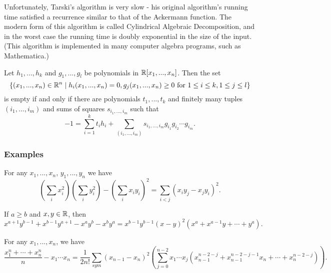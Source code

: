 \begin{rem} Unfortunately, Tarski's algorithm is very slow - his original algorithm's running time satisfied a recurrence similar to that of the Ackermann function. The modern form of this algorithm is called Cylindrical Algebraic Decomposition, and in the worst case the running time is doubly exponential in the size of the input. (This algorithm is implemented in many computer algebra programs, such as Mathematica.)
\end{rem}

\begin{thm} Let $h_1, ..., h_k$ and $g_1, ..., g_l$ be polynomials in $\mathbb{R}[x_1, ..., x_n]$. Then the set
\[
\{(x_1, ..., x_n)\in\mathbb{R}^n\mid h_i(x_1, ..., x_n) = 0, g_j(x_1, ..., x_n) \ge 0 \mbox{ for } 1\le i \le k, 1\le j \le l\}
\]
is empty if and only if there are polynomials $t_1, ..., t_k$ and finitely many tuples $(i_1, ..., i_m)$ and sums of squares $s_{i_1, ..., i_m}$ such that
\[
-1 = \sum_{i=1}^k t_ih_i + \sum_{(i_1, ..., i_m)} s_{i_1, ..., i_m}g_{i_1}g_{i_2}\cdots g_{i_m}.
\]
\end{thm}

\subsubsection{Examples}

\begin{prop} For any $x_1, ..., x_n$, $y_1, ..., y_n$ we have
\[
\left(\sum_i x_i^2\right)\left(\sum_i y_i^2\right) - \left(\sum_i x_iy_i\right)^2 = \sum_{i<j} (x_iy_j-x_jy_i)^2.
\]
\end{prop}

\begin{prop} If $a\ge b$ and $x,y\in \mathbb{R}$, then
\[
x^{a+1}y^{b-1} + x^{b-1}y^{a+1} - x^ay^b - x^by^a = x^{b-1}y^{b-1}(x-y)^2(x^a + x^{a-1}y + \cdots + y^a).
\]
\end{prop}

\begin{prop}[AM-GM] For any $x_1, ..., x_n$, we have
\[
\frac{x_1^n + \cdots + x_n^n}{n} - x_1\cdots x_n = \frac{1}{2n!} \sum_{sym} (x_{n-1}-x_n)^2\left(\sum_{j=0}^{n-2} x_1\cdots x_j(x_{n-1}^{n-2-j} + x_{n-1}^{n-2-j-1}x_n + \cdots + x_n^{n-2-j})\right).
\]
\end{prop}

